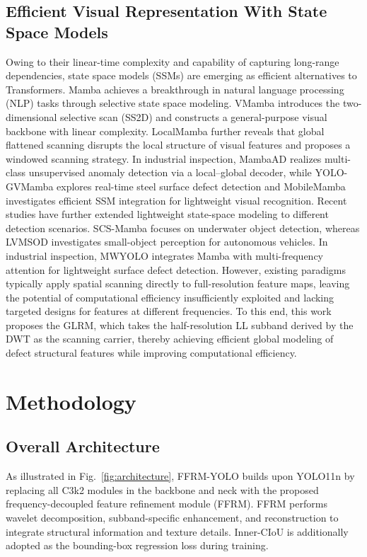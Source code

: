 \documentclass[pdflatex,sn-nature]{sn-jnl}
\begin{document}
\subsection{Efficient Visual Representation With State Space Models}
Owing to their linear-time complexity and capability of capturing long-range dependencies, state space models (SSMs) are emerging as efficient alternatives to Transformers. Mamba \cite{Gu2024Mamba} achieves a breakthrough in natural language processing (NLP) tasks through selective state space modeling. VMamba \cite{Liu2024VMamba} introduces the two-dimensional selective scan (SS2D) and constructs a general-purpose visual backbone with linear complexity. LocalMamba \cite{Huang2024LocalMamba} further reveals that global flattened scanning disrupts the local structure of visual features and proposes a windowed scanning strategy. In industrial inspection, MambaAD \cite{He2024MambaAD} realizes multi-class unsupervised anomaly detection via a local--global decoder, while YOLO-GVMamba \cite{Lei2025YOLOGVMamba} explores real-time steel surface defect detection and MobileMamba \cite{He2025MobileMamba} investigates efficient SSM integration for lightweight visual recognition. Recent studies have further extended lightweight state-space modeling to different detection scenarios. SCS-Mamba \cite{Xu2026SCSMamba} focuses on underwater object detection, whereas LVMSOD \cite{Fu2026LVMSOD} investigates small-object perception for autonomous vehicles. In industrial inspection, MWYOLO \cite{Chen2026MWYOLO} integrates Mamba with multi-frequency attention for lightweight surface defect detection. However, existing paradigms typically apply spatial scanning directly to full-resolution feature maps, leaving the potential of computational efficiency insufficiently exploited and lacking targeted designs for features at different frequencies. To this end, this work proposes the GLRM, which takes the half-resolution LL subband derived by the DWT as the scanning carrier, thereby achieving efficient global modeling of defect structural features while improving computational efficiency.


\section{Methodology}\label{sec:method}

\subsection{Overall Architecture}
As illustrated in Fig.~\ref{fig:architecture}, FFRM-YOLO builds upon YOLO11n \cite{Jocher2024YOLO11} by replacing all C3k2 modules in the backbone and neck with the proposed frequency-decoupled feature refinement module (FFRM). FFRM performs wavelet decomposition, subband-specific enhancement, and reconstruction to integrate structural information and texture details. Inner-CIoU is additionally adopted as the bounding-box regression loss during training.
\end{document}
